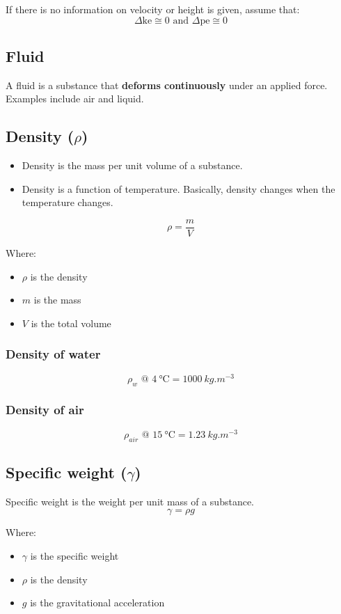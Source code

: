 \documentclass[11pt]{article}
\begin{document}
If there is no information on velocity or height is given, assume that:
\[\Delta \text{ke} \cong 0 \text{ and } \Delta \text{pe} \cong 0\]

\subsection{Fluid}
\label{sec:org804ffbe}
A fluid is a substance that \textbf{deforms continuously} under an applied force. Examples include air and liquid.

\subsection{Density (\(\rho\))}
\label{sec:orgfc73119}
\begin{itemize}
\item Density is the mass per unit volume of a substance.
\item Density is a function of temperature. Basically, density changes when the temperature changes.
\end{itemize}
\[\rho = \frac{m}{V}\]

Where:
\begin{itemize}
\item \(\rho\) is the density
\item \(m\) is the mass
\item \(V\) is the total volume
\end{itemize}

\subsubsection{Density of water}
\label{sec:org6a0e25f}
\[\rho_w \text{ @ } \qty{4}{\degreeCelsius} = \qty{1000}{kg.m^{-3}}\]

\subsubsection{Density of air}
\label{sec:org3f3f1ad}
\[\rho_{air} \text{ @ } \qty{15}{\degreeCelsius} = \qty{1.23}{kg.m^{-3}}\]

\subsection{Specific weight (\(\gamma\))}
\label{sec:orgc0e7253}
Specific weight is the weight per unit mass of a substance.
\[\gamma = \rho g\]

Where:
\begin{itemize}
\item \(\gamma\) is the specific weight
\item \(\rho\) is the density
\item \(g\) is the gravitational acceleration
\end{itemize}
\end{document}
